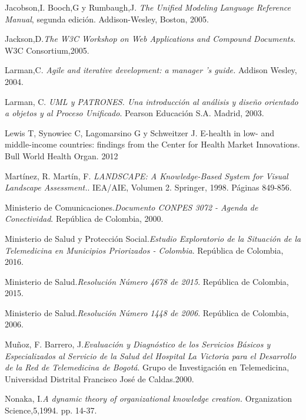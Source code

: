 \begin{thebibliography}{}
 Jacobson,I. Booch,G y Rumbaugh,J. \textit{The Unified Modeling Language Reference Manual}, segunda edición. Addison-Wesley, Boston, 2005.

 Jackson,D.\textit{The W3C Workshop on Web Applications and Compound Documents}. W3C Consortium,2005.

 Larman,C. \textit{Agile and iterative development: a manager ’s guide.} Addison Wesley, 2004.

 Larman, C. \textit{UML y PATRONES. Una introducción al análisis y diseño orientado a objetos y al Proceso Unificado}. Pearson Educación S.A. Madrid, 2003.

 Lewis T, Synowiec C, Lagomarsino G y Schweitzer J. E-health in low- and middle-income countries: findings from the Center for Health Market Innovations. Bull World Health Organ. 2012

 Martínez, R. Martín, F. \textit{LANDSCAPE: A Knowledge-Based System for Visual Landscape Assessment.}. IEA/AIE, Volumen 2. Springer, 1998. Páginas 849-856.

 Ministerio de Comunicaciones.\textit{Documento CONPES 3072 - Agenda de Conectividad}. República de Colombia, 2000.

 Ministerio de Salud y Protección Social.\textit{Estudio Exploratorio de la Situación de la Telemedicina en Municipios Priorizados - Colombia}. República de Colombia, 2016.

 Ministerio de Salud.\textit{Resolución Número 4678 de 2015}. República de Colombia, 2015.

 Ministerio de Salud.\textit{Resolución Número 1448 de 2006}. República de Colombia, 2006.

 Muñoz, F. Barrero, J.\textit{Evaluación y Diagnóstico de los Servicios Básicos y Especializados al Servicio de la Salud del Hospital La Victoria para el Desarrollo de la Red de Telemedicina de Bogotá}. Grupo de Investigación en Telemedicina,  Universidad Distrital Francisco José de Caldas.2000.

 Nonaka, I.\textit{A dynamic theory of organizational knowledge creation.} Organization Science,5,1994. pp. 14-37.


\end{thebibliography}
